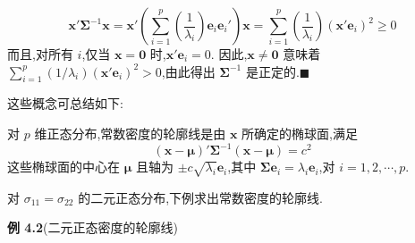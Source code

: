 \[
\mathbf{x}'\boldsymbol{\Sigma}^{-1}\mathbf{x}=\mathbf{x}'\left(\sum_{i=1}^{p}\left(\frac{1}{\lambda_i}\right)\mathbf{e}_i\mathbf{e}_i'\right)\mathbf{x}
=\sum_{i=1}^{p}\left(\frac{1}{\lambda_i}\right)(\mathbf{x}'\mathbf{e}_i)^{2}\geqslant 0
\]
而且,对所有 $i$,仅当 $\mathbf{x}=\mathbf{0}$ 时,$\mathbf{x}'\mathbf{e}_i=0$. 因此,$\mathbf{x}\neq\mathbf{0}$ 意味着 $\sum_{i=1}^{p}(1/\lambda_i)(\mathbf{x}'\mathbf{e}_i)^{2}>0$,由此得出 $\boldsymbol{\Sigma}^{-1}$ 是正定的.\hfill$\blacksquare$

这些概念可总结如下:

\begin{mvbox}
对 $p$ 维正态分布,常数密度的轮廓线是由 $\mathbf{x}$ 所确定的椭球面,满足
\label{eq:4-7}
\begin{equation}
(\mathbf{x}-\boldsymbol{\mu})'\boldsymbol{\Sigma}^{-1}(\mathbf{x}-\boldsymbol{\mu})=c^{2}
\tag{4-7}
\end{equation}
这些椭球面的中心在 $\boldsymbol{\mu}$ 且轴为 $\pm c\sqrt{\lambda_i}\mathbf{e}_i$,其中 $\boldsymbol{\Sigma}\mathbf{e}_i=\lambda_i\mathbf{e}_i$,对 $i=1,2,\cdots,p$.
\end{mvbox}

对 $\sigma_{11}=\sigma_{22}$ 的二元正态分布,下例求出常数密度的轮廓线.

\noindent\textbf{例 4.2}\quad (二元正态密度的轮廓线)

